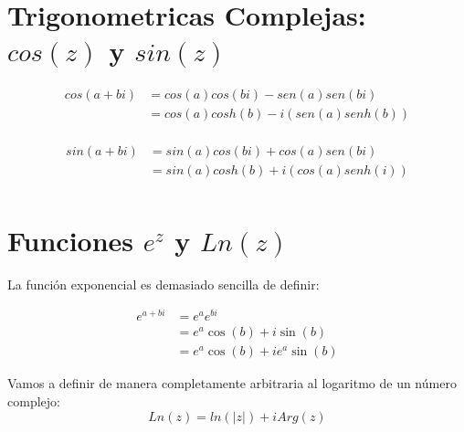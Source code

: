 \documentclass[12pt, fleqn]{report}                             %
\def \Eq {equation}                                             %
\newenvironment{MultiLineEquation}[1]                           %
        {\begin{\Eq}\begin{alignedat}{#1}}                          %
        {\end{alignedat}\end{\Eq}}                                  %
\theoremstyle{break}                                            %
\newcommand{\Wrap}[1]           {\left( #1 \right)}             %
\newcommand{\Cos}[1] {\cos\Wrap{#1}}                            %
\newcommand{\Sin}[1] {\sin\Wrap{#1}}                            %
\newcommand \Cis[1]  {\Cos{#1} + i \Sin{#1}}                    %
\begin{document}
        \section{Trigonometricas Complejas: $cos(z)$ y $sin(z)$}

            \begin{MultiLineEquation}{2}
                cos(a+bi)   &= cos(a)cos(bi) - sen(a)sen(bi)    \\
                            &= cos(a)cosh(b) - i(sen(a)senh(b)) \\
            \end{MultiLineEquation}

            \begin{MultiLineEquation}{2}
                sin(a+bi)   &= sin(a)cos(bi) + cos(a)sen(bi)    \\
                            &= sin(a)cosh(b) + i(cos(a)senh(i)) \\
            \end{MultiLineEquation}





        \clearpage
        \section{Funciones $e^z$ y $Ln(z)$}


            La función exponencial es demasiado sencilla de definir:

            \begin{MultiLineEquation}{2}
                e^{a+bi}    &= e^a e^{bi}                   \\
                            &= e^a \Cis{b}                  \\
                            &= e^a \Cos{b} + i e^a \Sin{b}  
            \end{MultiLineEquation}


            Vamos a definir de manera completamente arbitraria al
            logaritmo de un número complejo:
            \begin{equation}
                Ln(z) = ln(|z|) + i Arg(z)
            \end{equation}
\end{document}
